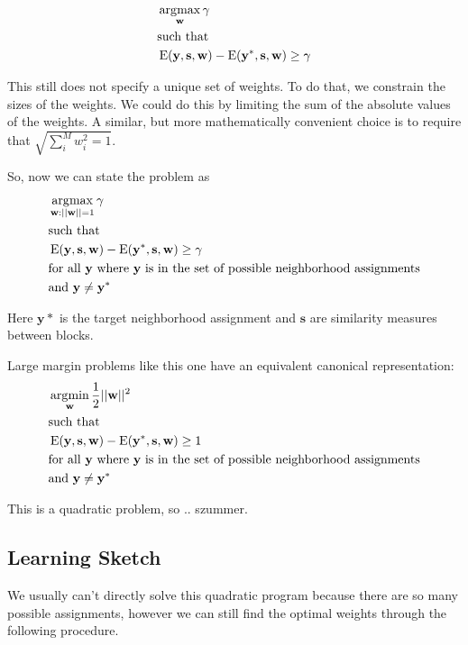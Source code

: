 \begin{align}
&\operatorname*{\arg\!\max}_{\mathbf{w}} \mathbf{\gamma} \\
&\text{such that} \\
&\operatorname{E}(\mathbf{y}, \mathbf{s}, \mathbf{w})
- \operatorname{E}(\mathbf{y}^*, \mathbf{s}, \mathbf{w}) \geq \gamma\\ 
\end{align}

This still does not specify a unique set of weights. To do that, we
constrain the sizes of the weights. We could do this by
limiting the sum of the absolute values of the weights. A similar, but
more mathematically convenient choice is to require that
$\sqrt{\sum_i^M w_i^2 = 1}$. 

So, now we can state the problem as 
%
\begin{align*}
&\operatorname*{\arg\!\max}_{\mathbf{w}:||\mathbf{w}||=1} \mathbf{\gamma} \\
&\text{such that} \\
&\operatorname{E}(\mathbf{y}, \mathbf{s}, \mathbf{w})
- \operatorname{E}(\mathbf{y}^*, \mathbf{s}, \mathbf{w}) \geq \gamma\\ 
&\text{for all } \mathbf{y} \text{ where } \mathbf{y} \text{ is in the set of
  possible neighborhood assignments}\\
&\text{and } \mathbf{y} \neq \mathbf{y}^*
\end{align*}
%

Here $\mathbf{y}*$ is the target neighborhood assignment and $\mathbf{s}$
are similarity measures between blocks. 

Large margin problems like this one have an equivalent canonical
representation: 
%
\begin{align*}
&\operatorname*{\arg\!\min}_{\mathbf{w}} \frac{1}{2}||\mathbf{w}||^2 \\
&\text{such that} \\
&\operatorname{E}(\mathbf{y}, \mathbf{s}, \mathbf{w})
- \operatorname{E}(\mathbf{y}^*, \mathbf{s}, \mathbf{w}) \geq 1 \\ 
&\text{for all } \mathbf{y} \text{ where } \mathbf{y} \text{ is in the set of
  possible neighborhood assignments}\\
&\text{and } \mathbf{y} \neq \mathbf{y}^*
\end{align*}

This is a quadratic problem, so .. szummer.

\subsection*{Learning Sketch}
We usually can't directly solve this quadratic program because there
are so many possible assignments, however we can still find the
optimal weights through the following procedure.

